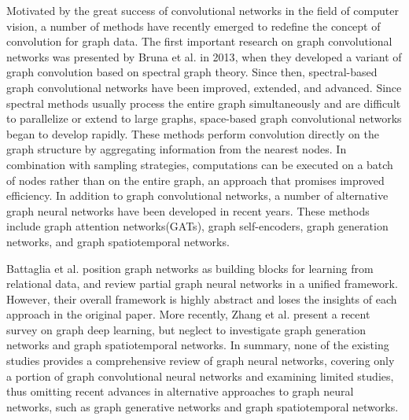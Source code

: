 \documentclass[a4paper,11pt]{article}
\begin{document}
Motivated by the great success of convolutional networks in the field of computer vision, a number of methods have recently emerged to redefine the concept of convolution for graph data. The first important research on graph convolutional networks was presented by Bruna et al. in 2013\cite{bruna2013spectral}, when they developed a variant of graph convolution based on spectral graph theory. Since then, spectral-based graph convolutional networks have been improved, extended, and advanced. Since spectral methods usually process the entire graph simultaneously and are difficult to parallelize or extend to large graphs, space-based graph convolutional networks began to develop rapidly. These methods perform convolution directly on the graph structure by aggregating information from the nearest nodes. In combination with sampling strategies, computations can be executed on a batch of nodes rather than on the entire graph, an approach that promises improved efficiency. In addition to graph convolutional networks, a number of alternative graph neural networks have been developed in recent years. These methods include graph attention networks(GATs)\cite{veličković2018graph}, graph self-encoders\cite{salehi2019graph}, graph generation networks\cite{liao2019efficient}, and graph spatiotemporal networks\cite{Yu_2018}.

Battaglia et al.\cite{battaglia2018relational} position graph networks as building blocks for learning from relational data, and review partial graph neural networks in a unified framework. However, their overall framework is highly abstract and loses the insights of each approach in the original paper. More recently, Zhang et al. present a recent survey\cite{zhang2020deep} on graph deep learning, but neglect to investigate graph generation networks and graph spatiotemporal networks. In summary, none of the existing studies provides a comprehensive review of graph neural networks, covering only a portion of graph convolutional neural networks and examining limited studies, thus omitting recent advances in alternative approaches to graph neural networks, such as graph generative networks and graph spatiotemporal networks.
\end{document}
